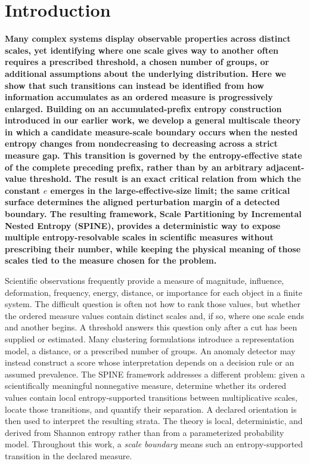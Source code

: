\documentclass[aip,cha,reprint,superscriptaddress,floatfix]{revtex4-2}
\theoremstyle{definition}
\theoremstyle{remark}
\begin{document}
\maketitle

\section{Introduction}
\label{sec:introduction}

\textbf{Many complex systems display observable properties across distinct scales, yet identifying where one scale gives way to another often requires a prescribed threshold, a chosen number of groups, or additional assumptions about the underlying distribution. Here we show that such transitions can instead be identified from how information accumulates as an ordered measure is progressively enlarged. Building on an accumulated-prefix entropy construction introduced in our earlier work, we develop a general multiscale theory in which a candidate measure-scale boundary occurs when the nested entropy changes from nondecreasing to decreasing across a strict measure gap. This transition is governed by the entropy-effective state of the complete preceding prefix, rather than by an arbitrary adjacent-value threshold. The result is an exact critical relation from which the constant \(e\) emerges in the large-effective-size limit; the same critical surface determines the aligned perturbation margin of a detected boundary. The resulting framework, Scale Partitioning by Incremental Nested Entropy (SPINE), provides a deterministic way to expose multiple entropy-resolvable scales in scientific measures without prescribing their number, while keeping the physical meaning of those scales tied to the measure chosen for the problem.}

Scientific observations frequently provide a measure of magnitude, influence, deformation, frequency, energy, distance, or importance for each object in a finite system. The difficult question is often not how to rank those values, but whether the ordered measure values contain distinct scales and, if so, where one scale ends and another begins. A threshold answers this question only after a cut has been supplied or estimated. Many clustering formulations introduce a representation model, a distance, or a prescribed number of groups. An anomaly detector may instead construct a score whose interpretation depends on a decision rule or an assumed prevalence. The SPINE framework addresses a different problem: given a scientifically meaningful nonnegative measure, determine whether its ordered values contain local entropy-supported transitions between multiplicative scales, locate those transitions, and quantify their separation. A declared orientation is then used to interpret the resulting strata. The theory is local, deterministic, and derived from Shannon entropy rather than from a parameterized probability model. Throughout this work, a \emph{scale boundary} means such an entropy-supported transition in the declared measure.
\end{document}
